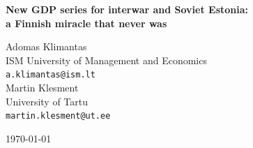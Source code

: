 \documentclass[12pt,a4paper]{article}
\begin{document}

\begin{titlepage}
    \centering
    \vspace*{2cm}
    {\large\bfseries New GDP series for interwar and Soviet Estonia:\\
    a Finnish miracle that never was\par}
    \vspace{1.5cm}
    {\normalsize
    Adomas Klimantas\\
    ISM University of Management and Economics\\
    \texttt{a.klimantas@ism.lt}\\[0.8em]
    Martin Klesment\\
    University of Tartu\\
    \texttt{martin.klesment@ut.ee}
    \par}
    \vspace{1.5cm}
    {\small\today\par}
    \vspace{2cm}
    \begin{abstract}
        \noindent

\end{abstract}
\end{titlepage}
\end{document}
